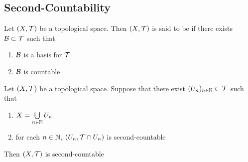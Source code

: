 \documentclass{book}
\begin{document}
	
	
	
	
	
	
	
	
	
	
	
	
	
	
	
	
	
	
	
	
	
	
	
	
	
	
	
	
	
	
	
	
	
	
	
	
	
	
	
	
	\subsection{Second-Countability}

	\begin{defn} 
		Let $(X, \mathcal{T})$ be a topological space. Then $(X, \mathcal{T})$ is said to be  if there exists $\mathcal{B} \subset \mathcal{T}$ such that 
		\begin{enumerate}
			\item $\mathcal{B}$ is a basis for $\mathcal{T}$
			\item $\mathcal{B}$ is countable
		\end{enumerate} 
	\end{defn}

	\begin{ex} 
		Let $(X, \mathcal{T})$ be a topological space. Suppose that there exist $(U_n)_{n \in \mathbb{N}} \subset \mathcal{T}$ such that 
		\begin{enumerate}
			\item $X = \bigcup\limits_{n \in \mathbb{N}}U_n$
			\item for each $n \in \mathbb{N}$, $(U_n, \mathcal{T} \cap U_n)$ is second-countable
		\end{enumerate}
		Then $(X, \mathcal{T})$ is second-countable
	\end{ex}
	
\end{document}
